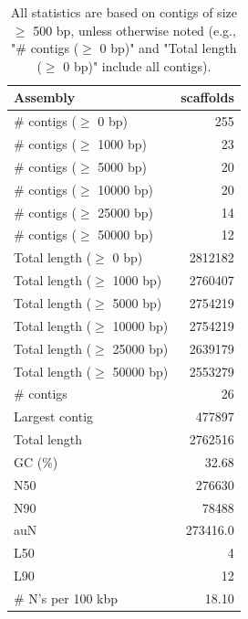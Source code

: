 \documentclass[12pt,a4paper]{article}
\begin{document}
\begin{table}[ht]
\begin{center}
\caption{All statistics are based on contigs of size $\geq$ 500 bp, unless otherwise noted (e.g., "\# contigs ($\geq$ 0 bp)" and "Total length ($\geq$ 0 bp)" include all contigs).}
\begin{tabular}{|l*{1}{|r}|}
\hline
Assembly & scaffolds \\ \hline
\# contigs ($\geq$ 0 bp) & 255 \\ \hline
\# contigs ($\geq$ 1000 bp) & 23 \\ \hline
\# contigs ($\geq$ 5000 bp) & 20 \\ \hline
\# contigs ($\geq$ 10000 bp) & 20 \\ \hline
\# contigs ($\geq$ 25000 bp) & 14 \\ \hline
\# contigs ($\geq$ 50000 bp) & 12 \\ \hline
Total length ($\geq$ 0 bp) & 2812182 \\ \hline
Total length ($\geq$ 1000 bp) & 2760407 \\ \hline
Total length ($\geq$ 5000 bp) & 2754219 \\ \hline
Total length ($\geq$ 10000 bp) & 2754219 \\ \hline
Total length ($\geq$ 25000 bp) & 2639179 \\ \hline
Total length ($\geq$ 50000 bp) & 2553279 \\ \hline
\# contigs & 26 \\ \hline
Largest contig & 477897 \\ \hline
Total length & 2762516 \\ \hline
GC (\%) & 32.68 \\ \hline
N50 & 276630 \\ \hline
N90 & 78488 \\ \hline
auN & 273416.0 \\ \hline
L50 & 4 \\ \hline
L90 & 12 \\ \hline
\# N's per 100 kbp & 18.10 \\ \hline
\end{tabular}
\end{center}
\end{table}
\end{document}
